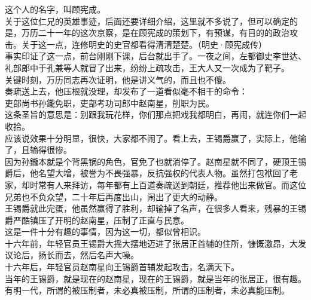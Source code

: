 \begin{multicols}{\theparacolNo}
这个人的名字，叫顾宪成。\\

关于这位仁兄的英雄事迹，后面还要详细介绍，这里就不多说了，但可以确定的是，万历二十一年的这次京察，是在顾宪成的策划下，有预谋，有目的的政治攻击。关于这一点，连修明史的史官都看得清清楚楚。（明史·顾宪成传）\\

事实印证了这一点，前台刚刚下课，后台就出手了。一夜之间，左都御史李世达、礼部郎中于孔兼等人就冒了出来，纷纷上疏攻击，王大人又一次成为了靶子。\\

关键时刻，万历同志再次证明，他是讲义气的，而且也不傻。\\

奏疏送上去，他压根就没理，却发布了一道看似毫不相干的命令：\\

吏部尚书孙鑨免职，吏部考功司郎中赵南星，削职为民。\\

这条圣旨的意思是：别跟我玩花样，你们那点把戏我都明白，再闹，就连你们一起收拾。\\

应该说效果十分明显，很快，大家都不闹了。看上去，王锡爵赢了，实际上，他输了，且输得很惨。\\

因为孙鑨本就是个背黑锅的角色，官免了也就消停了。赵南星就不同了，硬顶王锡爵后，他名望大增，被誉为不畏强暴，反抗强权的代表人物。虽然打包袱回了老家，却时常有人来拜访，每年都有上百道奏疏送到朝廷，推荐他出来做官。而这位兄弟也不负众望，二十年后再度出山，闹出了更大的动静。\\

王锡爵就此完蛋，他虽然赢得了胜利，却输掉了名声，在很多人看来，残暴的王锡爵严酷镇压了开明的赵南星，压制了正直与民意。\\

这是一件十分有趣的事情，因为这一切，都似曾相识。\\

十六年前，年轻官员王锡爵大摇大摆地迈进了张居正首辅的住所，慷慨激昂，大发议论后，扬长而去，然后名声大噪。\\

十六年后，年轻官员赵南星向王锡爵首辅发起攻击，名满天下。\\

当年的王锡爵，就是现在的赵南星，现在的王锡爵，就是当年的张居正，很有趣。\\

有明一代，所谓的被压制者，未必真被压制，所谓的压制者，未必真能压制。\\


\end{multicols}
